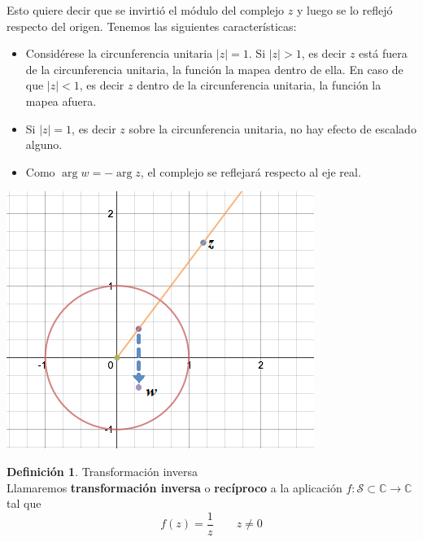 \documentclass[12pt]{article}
\theoremstyle{definition}
\newtheorem{definition}{Definici\'on}[section]
\theoremstyle{theorem}
\theoremstyle{corolary}
\begin{document}
Esto quiere decir que se invirti\'o el m\'odulo del complejo $z$ y luego se lo reflej\'o respecto del origen. Tenemos las siguientes caracter\'isticas:

\begin{multicols}{2}
\begin{itemize}
	\item Consid\'erese la circunferencia unitaria $|z| = 1$. Si $|z|>1$, es decir $z$ est\'a fuera de la circunferencia unitaria, la funci\'on la mapea dentro de ella. En caso de que $|z|<1$, es decir $z$ dentro de la circunferencia unitaria, la funci\'on la mapea afuera.
	\item Si $|z|=1$, es decir $z$ sobre la circunferencia unitaria, no hay efecto de escalado alguno.
	\item Como $\arg w = - \arg z$, el complejo se reflejar\'a respecto al eje real.
\end{itemize}

\begin{center}
	\includegraphics[scale=0.8]{inverse.png}
\end{center}

\end{multicols}

\colorbox{green!40!white!80}{\parbox{\linewidth}{
 \theoremstyle{definition}
 \begin{definition}{Transformaci\'on inversa}\\
  	Llamaremos \textbf{transformaci\'on inversa} o \textbf{rec\'iproco} a la aplicaci\'on $f: \mathcal{S} \subset \mathbb{C} \rightarrow \mathbb{C}$ tal que $$f(z) = \frac{1}{z} \qquad z\neq0$$

 \end{definition}}}
\linebreak
\linebreak
\end{document}
